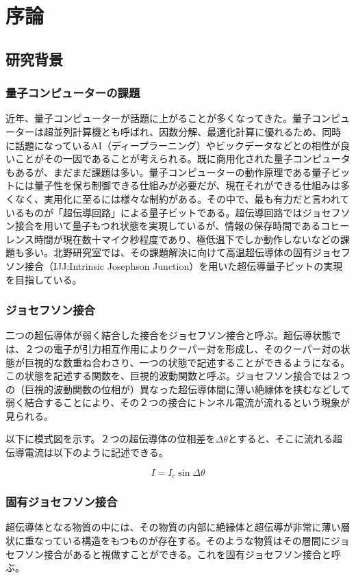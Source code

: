\chapter{序論}


\section{研究背景}
\subsection{量子コンピューターの課題}
近年、量子コンピューターが話題に上がることが多くなってきた。量子コンピューターは超並列計算機とも呼ばれ、因数分解、最適化計算に優れるため、同時に話題になっているAI（ディープラーニング）やビックデータなどとの相性が良いことがその一因であることが考えられる。既に商用化された量子コンピュータもあるが、まだまだ課題は多い。量子コンピューターの動作原理である量子ビットには量子性を保ち制御できる仕組みが必要だが、現在それができる仕組みは多くなく、実用化に至るには様々な制約がある。その中で、最も有力だと言われているものが「超伝導回路」による量子ビットである。超伝導回路ではジョセフソン接合を用いて量子もつれ状態を実現しているが、情報の保存時間であるコヒーレンス時間が現在数十マイク秒程度であり、極低温下でしか動作しないなどの課題も多い。北野研究室では、その課題解決に向けて高温超伝導体の固有ジョセフソン接合（IJJ:Intrinsic Josephson Junction）を用いた超伝導量子ビットの実現を目指している。

\subsection{ジョセフソン接合}
二つの超伝導体が弱く結合した接合をジョセフソン接合と呼ぶ。超伝導状態では、２つの電子が引力相互作用によりクーパー対を形成し、そのクーパー対の状態が巨視的な数重ね合わさり、一つの状態で記述することができるようになる。この状態を記述する関数を、巨視的波動関数と呼ぶ。ジョセフソン接合では２つの（巨視的波動関数の位相が）異なった超伝導体間に薄い絶縁体を挟むなどして弱く結合することにより、その２つの接合にトンネル電流が流れるという現象が見られる。

以下に模式図を示す。２つの超伝導体の位相差を$ \Delta \theta $とすると、そこに流れる超伝導電流は以下のように記述できる。

\[ I = I_c \sin{\Delta \theta } \]

\subsection{固有ジョセフソン接合}
超伝導体となる物質の中には、その物質の内部に絶縁体と超伝導が非常に薄い層状に重なっている構造をもつものが存在する。そのような物質はその層間にジョセフソン接合があると視做すことができる。これを固有ジョセフソン接合と呼ぶ。

